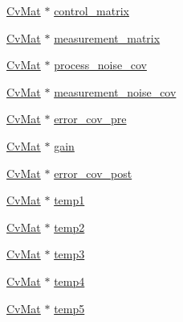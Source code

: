 \begin{DoxyCompactItemize}
\item 
\hyperlink{structCvMat}{Cv\-Mat} $\ast$ \hyperlink{structCvKalman_a4ed646de106c90cdee32abb0d0647b77}{control\-\_\-matrix}
\item 
\hyperlink{structCvMat}{Cv\-Mat} $\ast$ \hyperlink{structCvKalman_af5574f13474afd7ba62069b5835354a9}{measurement\-\_\-matrix}
\item 
\hyperlink{structCvMat}{Cv\-Mat} $\ast$ \hyperlink{structCvKalman_a81abc95603757cab3faed0dafab54685}{process\-\_\-noise\-\_\-cov}
\item 
\hyperlink{structCvMat}{Cv\-Mat} $\ast$ \hyperlink{structCvKalman_a9d9f6f208edab2a4202556a4fee73768}{measurement\-\_\-noise\-\_\-cov}
\item 
\hyperlink{structCvMat}{Cv\-Mat} $\ast$ \hyperlink{structCvKalman_a7b31d7f98e9bc325f20d329b6b8c36c4}{error\-\_\-cov\-\_\-pre}
\item 
\hyperlink{structCvMat}{Cv\-Mat} $\ast$ \hyperlink{structCvKalman_a2896f77c90affaf8a9ed3ba27f1e8337}{gain}
\item 
\hyperlink{structCvMat}{Cv\-Mat} $\ast$ \hyperlink{structCvKalman_af4f76ef05f89ffce977a35e731d9a329}{error\-\_\-cov\-\_\-post}
\item 
\hyperlink{structCvMat}{Cv\-Mat} $\ast$ \hyperlink{structCvKalman_a69279dc4f91f2e812c1ac36f018fa78c}{temp1}
\item 
\hyperlink{structCvMat}{Cv\-Mat} $\ast$ \hyperlink{structCvKalman_ac4977920e1427681f8cc9f6809fe5827}{temp2}
\item 
\hyperlink{structCvMat}{Cv\-Mat} $\ast$ \hyperlink{structCvKalman_a2e0a06d409a0e5584de0566113398bf3}{temp3}
\item 
\hyperlink{structCvMat}{Cv\-Mat} $\ast$ \hyperlink{structCvKalman_ae65fae2a986ffbfdeda3c0d30fd1aefc}{temp4}
\item 
\hyperlink{structCvMat}{Cv\-Mat} $\ast$ \hyperlink{structCvKalman_a094d6fae600bbbe2cc7b85ab4cfffa9e}{temp5}
\end{DoxyCompactItemize}


